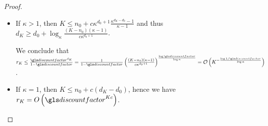 \begin{subappendices}
\begin{proof}
		\begin{itemize}
			\item If $\kappa > 1$, then $K \leq n_0 + c\kappa^{d_0+1}\frac{\kappa^{d_K-d_0}-1}{\kappa-1}$ and thus $d_K \geq d_0 + \log_\kappa \frac{(K-n_0)(\kappa - 1)}{c\kappa^{d_0+1}}$.
			
			We conclude that $r_K \leq \frac{\discount^{d_K}}{1-\discount} = \frac{1}{1-\discount} \left( \frac{(K-n_0)(\kappa - 1)}{c\kappa^{d_0+1}} \right)^\frac{\log \discount}{\log \kappa} = \cO\left(K^{-\frac{\log 1/\discount}{\log \kappa}}\right)$.
			
			\item If $\kappa = 1$, then $K \leq n_0 + c(d_K-d_0)$, hence we have $r_K = O\left(\discount^{Kc}\right)$.
		\end{itemize}
	\end{proof}
	

\end{subappendices}
